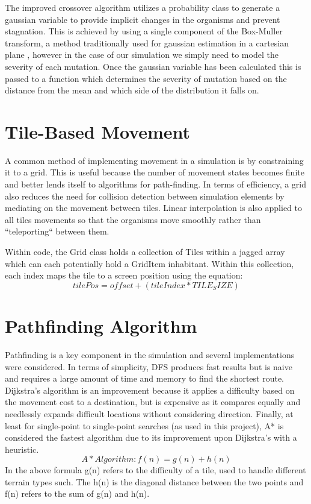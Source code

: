 \documentclass[a4paper, oneside, 11pt]{report}
\begin{document}
The improved crossover algorithm utilizes a probability class to generate a gaussian variable to provide implicit changes in the organisms and prevent stagnation. This is achieved by using a single component of the Box-Muller transform, a method traditionally used for gaussian estimation in a cartesian plane \cite{box1958note}, however in the case of our simulation we simply need to model the severity of each mutation. Once the gaussian variable has been calculated this is passed to a function which determines the severity of mutation based on the distance from the mean and which side of the distribution it falls on.

\section{Tile-Based Movement}\label{grid}
A common method of implementing movement in a simulation is by constraining it to a grid. This is useful because the number of movement states becomes finite and better lends itself to algorithms for path-finding. In terms of efficiency, a grid also reduces the need for collision detection between simulation elements by mediating on the movement between tiles. Linear interpolation is also applied to all tiles movements so that the organisms move smoothly rather than ``teleporting`` between them.

Within code, the Grid class holds a collection of Tiles within a jagged array which can each potentially hold a GridItem inhabitant. Within this collection, each index maps the tile to a screen position using the equation:
\[tilePos = offset + (tileIndex * TILE_SIZE)\]

\section{Pathfinding Algorithm}\label{pathfinding}
Pathfinding is a key component in the simulation and several implementations were considered. In terms of simplicity, DFS produces fast results but is naive and requires a large amount of time and memory to find the shortest route. Dijkstra's algorithm is an improvement because it applies a difficulty based on the movement cost to a destination, but is expensive as it compares equally and needlessly expands difficult locations without considering direction. Finally, at least for single-point to single-point searches (as used in this project), A* is considered the fastest algorithm \cite{belwariar} due to its improvement upon Dijkstra's with a heuristic. 
\[A* Algorithm: f(n) = g(n) + h(n)\]
In the above formula g(n) refers to the difficulty of a tile, used to handle different terrain types such. The h(n) is the diagonal distance between the two points and f(n) refers to the sum of g(n) and h(n).
\end{document}
